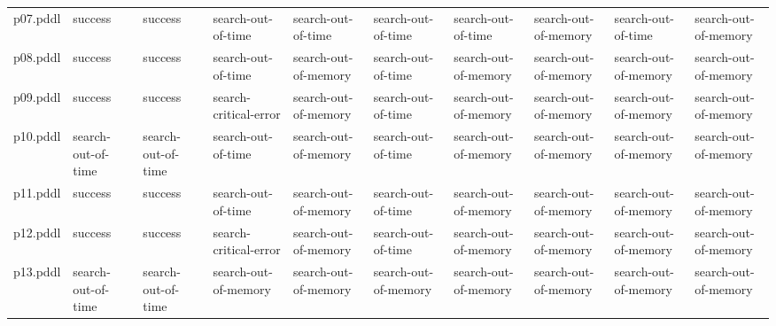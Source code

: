 \documentclass{article}
\begin{document}
\begin{tabular}{@{}lrrrrrrrrr@{}}
p07.pddl & \multicolumn{1}{|l|}{success} & \multicolumn{1}{|l|}{success} & \multicolumn{1}{|l|}{search-out-of-time} & \multicolumn{1}{|l|}{search-out-of-time} & \multicolumn{1}{|l|}{search-out-of-time} & \multicolumn{1}{|l|}{search-out-of-time} & \multicolumn{1}{|l|}{search-out-of-memory} & \multicolumn{1}{|l|}{search-out-of-time} & \multicolumn{1}{|l|}{search-out-of-memory} \\
p08.pddl & \multicolumn{1}{|l|}{success} & \multicolumn{1}{|l|}{success} & \multicolumn{1}{|l|}{search-out-of-time} & \multicolumn{1}{|l|}{search-out-of-memory} & \multicolumn{1}{|l|}{search-out-of-time} & \multicolumn{1}{|l|}{search-out-of-memory} & \multicolumn{1}{|l|}{search-out-of-memory} & \multicolumn{1}{|l|}{search-out-of-memory} & \multicolumn{1}{|l|}{search-out-of-memory} \\
p09.pddl & \multicolumn{1}{|l|}{success} & \multicolumn{1}{|l|}{success} & \multicolumn{1}{|l|}{search-critical-error} & \multicolumn{1}{|l|}{search-out-of-memory} & \multicolumn{1}{|l|}{search-out-of-time} & \multicolumn{1}{|l|}{search-out-of-memory} & \multicolumn{1}{|l|}{search-out-of-memory} & \multicolumn{1}{|l|}{search-out-of-memory} & \multicolumn{1}{|l|}{search-out-of-memory} \\
p10.pddl & \multicolumn{1}{|l|}{search-out-of-time} & \multicolumn{1}{|l|}{search-out-of-time} & \multicolumn{1}{|l|}{search-out-of-time} & \multicolumn{1}{|l|}{search-out-of-memory} & \multicolumn{1}{|l|}{search-out-of-time} & \multicolumn{1}{|l|}{search-out-of-memory} & \multicolumn{1}{|l|}{search-out-of-memory} & \multicolumn{1}{|l|}{search-out-of-memory} & \multicolumn{1}{|l|}{search-out-of-memory} \\
p11.pddl & \multicolumn{1}{|l|}{success} & \multicolumn{1}{|l|}{success} & \multicolumn{1}{|l|}{search-out-of-time} & \multicolumn{1}{|l|}{search-out-of-memory} & \multicolumn{1}{|l|}{search-out-of-time} & \multicolumn{1}{|l|}{search-out-of-memory} & \multicolumn{1}{|l|}{search-out-of-memory} & \multicolumn{1}{|l|}{search-out-of-memory} & \multicolumn{1}{|l|}{search-out-of-memory} \\
p12.pddl & \multicolumn{1}{|l|}{success} & \multicolumn{1}{|l|}{success} & \multicolumn{1}{|l|}{search-critical-error} & \multicolumn{1}{|l|}{search-out-of-memory} & \multicolumn{1}{|l|}{search-out-of-time} & \multicolumn{1}{|l|}{search-out-of-memory} & \multicolumn{1}{|l|}{search-out-of-memory} & \multicolumn{1}{|l|}{search-out-of-memory} & \multicolumn{1}{|l|}{search-out-of-memory} \\
p13.pddl & \multicolumn{1}{|l|}{search-out-of-time} & \multicolumn{1}{|l|}{search-out-of-time} & \multicolumn{1}{|l|}{search-out-of-memory} & \multicolumn{1}{|l|}{search-out-of-memory} & \multicolumn{1}{|l|}{search-out-of-memory} & \multicolumn{1}{|l|}{search-out-of-memory} & \multicolumn{1}{|l|}{search-out-of-memory} & \multicolumn{1}{|l|}{search-out-of-memory} & \multicolumn{1}{|l|}{search-out-of-memory} \\

\end{tabular}
\end{document}
